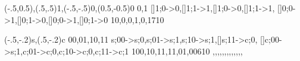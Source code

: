 \documentclass[letterpaper,landscape,KOMA,calcdimensions,display]{powersem}
\begin{document}
\begin{slide}

\renewcommand{\automatonname}{parity test}

\simulatedfa*{\linewidth}{\textheight}
{{(-.5,0.5)},{(.5,.5)1},{(-.5,-.5)0},{(0.5,-0.5)0}}
{0,1}
{%
  []1;0->0,[]1;1->1,[]1;0->0,[]1;1->1,%
  []0;0->1,[]0;1->0,[]0;0->1,[]0;1->0%
  }
{1}{0,0,0,1,0,1}{7}{10}

\newslide

\renewcommand{\automatonname}{one bit serial adder}
  \simulatema*{\linewidth}{\textheight}
  {{(-.5,-.2)s},{(.5,-.2)c}}
  {00,01,10,11}
  {%
    s;00->s;0,s;01->s;1,s;10->s;1,[]s;11->c;0,%
    []c;00->s;1,c;01->c;0,c;10->c;0,c;11->c;1%
    }
  {1}{00,10,11,11,01,00}{6}{10}
  {,,,,,,,,,,,,,}
\end{slide}
\end{document}
